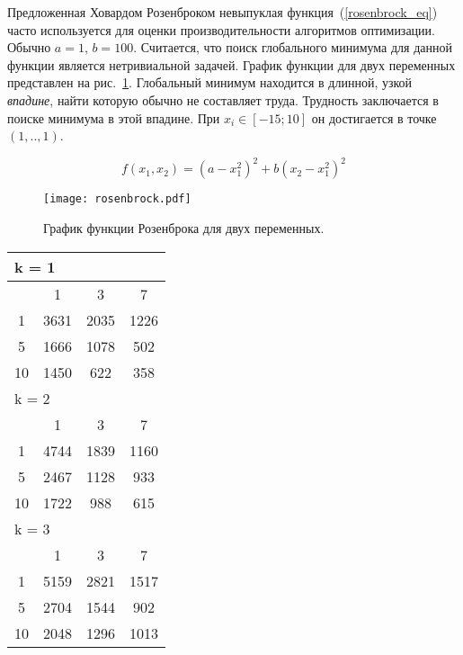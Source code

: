 Предложенная Ховардом Розенброком невыпуклая функция~(\ref{rosenbrock_eq}) часто используется для оценки производительности алгоритмов оптимизации. Обычно $a = 1$, $b = 100$. Считается, что поиск глобального минимума для данной функции является нетривиальной задачей. График функции для двух переменных представлен на рис.~\ref{rosenbrock_plot}. Глобальный минимум находится в длинной, узкой \textit{впадине}, найти которую обычно не составляет труда. Трудность заключается в поиске минимума в этой впадине. При $x_i \in [-15; 10]$ он достигается в точке $(1,..,1)$.

\begin{equation}
\label{rosenbrock_eq}
f(x_1, x_2) = (a - x_1^2)^2 + b(x_2 - x_1^2)^2
\end{equation}


\begin{figure}
    \centering
    \texttt{[image: rosenbrock.pdf]}
    \caption{График функции Розенброка для двух переменных.}
    \label{rosenbrock_plot}
\end{figure}

\begin{table}
\begin{tabular}{|*4{c|}}
\hline
\multicolumn{4}{|l|}{k = 1} \\
\hline
\diagbox{$\mu$}{$\lambda$} & \multicolumn{1}{c|}{1} & \multicolumn{1}{c|}{3} & \multicolumn{1}{c|}{7} \\
\hline
1 & 3631 & 2035 & 1226 \\
\hline
5 & 1666 & 1078 & 502 \\
\hline
10 & 1450 & 622 & 358 \\
\hline
\multicolumn{4}{|l|}{k = 2} \\
\hline
\diagbox{$\mu$}{$\lambda$} & \multicolumn{1}{c|}{1} & \multicolumn{1}{c|}{3} & \multicolumn{1}{c|}{7} \\
\hline
1 & 4744 & 1839 & 1160 \\
\hline
5 & 2467 & 1128 & 933 \\
\hline
10 & 1722 & 988 & 615 \\
\hline
\multicolumn{4}{|l|}{k = 3} \\
\hline
\diagbox{$\mu$}{$\lambda$} & \multicolumn{1}{c|}{1} & \multicolumn{1}{c|}{3} & \multicolumn{1}{c|}{7} \\
\hline
1 & 5159 & 2821 & 1517 \\
\hline
5 & 2704 & 1544 & 902 \\
\hline
10 & 2048 & 1296 & 1013 \\
\hline
\end{tabular}
\end{table}

